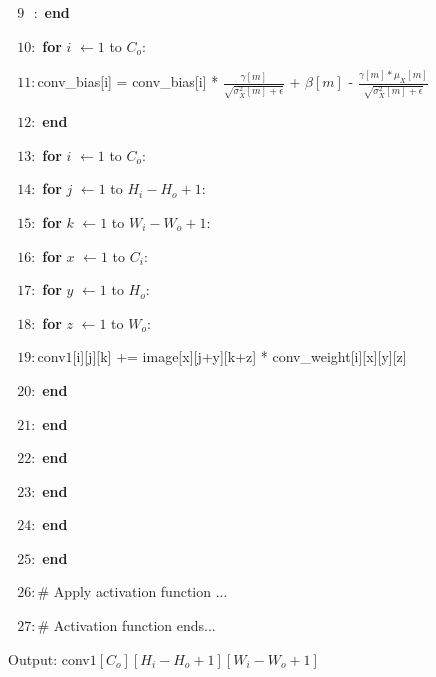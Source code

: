 \documentclass[11pt]{article}
\begin{document}
\begin{solution}
\item \qquad $\text{  } 9 \text{   }:$\textbf{ end}
\item \qquad $\text{  } 10:$\textbf{ for} $i$ $\leftarrow 1$ to $C_o$:
\item \qquad $\text{  } 11:$\qquad conv\_bias[i] = conv\_bias[i] * $\frac{\gamma[m]}{\sqrt{\sigma_X^2[m]+\epsilon}}$ + $\beta[m]$ - $\frac{\gamma[m]*\mu_X[m]}{\sqrt{\sigma_X^2[m]+\epsilon}}$
\item \qquad $\text{  } 12:$\textbf{ end}
\item \qquad $\text{  } 13:$\textbf{ for} $i$ $\leftarrow 1$ to $C_o$:
\item \qquad $\text{  } 14:$\qquad \textbf{ for} $j$ $\leftarrow 1$ to $H_i - H_o +1$:
\item \qquad $\text{  } 15:$\qquad\qquad \textbf{ for} $k$ $\leftarrow 1$ to $W_i - W_o + 1$:
\item \qquad $\text{  } 16:$\qquad\qquad\qquad\textbf{ for} $x$ $\leftarrow 1$ to $C_i$:
\item \qquad $\text{  } 17:$\qquad\qquad\qquad\qquad\textbf{ for} $y$ $\leftarrow 1$ to $H_o$:
\item \qquad $\text{  } 18:$\qquad\qquad\qquad\qquad\qquad\textbf{ for} $z$ $\leftarrow 1$ to $W_o$:
\item \qquad $\text{  } 19:$\qquad\qquad\qquad\qquad\qquad \qquad conv$1$[i][j][k] += image[x][j+y][k+z] * conv\_weight[i][x][y][z]
\item \qquad $\text{  } 20:$\qquad\qquad\qquad\qquad\qquad\textbf{ end}
\item \qquad $\text{  } 21:$\qquad\qquad\qquad\qquad\textbf{ end}
\item \qquad $\text{  } 22:$\qquad\qquad\qquad\textbf{ end}
\item \qquad $\text{  } 23:$\qquad\qquad\textbf{ end}
\item \qquad $\text{  } 24:$\qquad\textbf{ end}
\item \qquad $\text{  } 25:$\textbf{ end}
\item \qquad $\text{  } 26:$\# Apply activation function ...
\item \qquad $\text{  } 27:$\# Activation function ends...
\item Output: conv$1[C_o][H_i-H_o+1][W_i-W_o+1]$
\end{solution}
\setcounter{page}{8}
\end{document}
